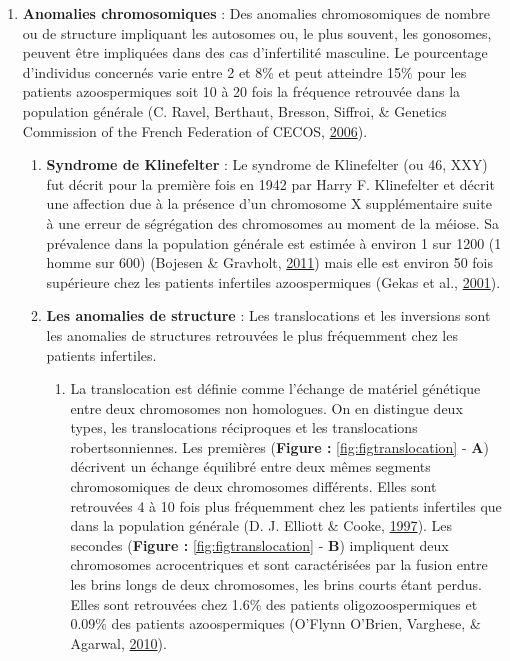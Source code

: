\documentclass[12pt,twoside]{reedthesis}
\providecommand{\tightlist}{%
  \setlength{\itemsep}{0pt}\setlength{\parskip}{0pt}}
\theoremstyle{definition}
\theoremstyle{definition}
\theoremstyle{remark}
\begin{document}
  \begin{enumerate}
  \def\labelenumi{\arabic{enumi}.}
  \setcounter{enumi}{1}
  \tightlist
  \item
    \textbf{Anomalies chromosomiques} : Des anomalies chromosomiques de
    nombre ou de structure impliquant les autosomes ou, le plus souvent,
    les gonosomes, peuvent être impliquées dans des cas d'infertilité
    masculine. Le pourcentage d'individus concernés varie entre 2 et 8\%
    et peut atteindre 15\% pour les patients azoospermiques soit 10 à 20
    fois la fréquence retrouvée dans la population générale (C. Ravel,
    Berthaut, Bresson, Siffroi, \& Genetics Commission of the French
    Federation of CECOS, \protect\hyperlink{ref-Ravel2006}{2006}).
  
    \begin{enumerate}
    \def\labelenumii{\alph{enumii}.}
    \item
      \textbf{Syndrome de Klinefelter} : Le syndrome de Klinefelter (ou
      46, XXY) fut décrit pour la première fois en 1942 par Harry F.
      Klinefelter et décrit une affection due à la présence d'un
      chromosome X supplémentaire suite à une erreur de ségrégation des
      chromosomes au moment de la méiose. Sa prévalence dans la population
      générale est estimée à environ 1 sur 1200 (1 homme sur 600) (Bojesen
      \& Gravholt, \protect\hyperlink{ref-Bojesen2011}{2011}) mais elle
      est environ 50 fois supérieure chez les patients infertiles
      azoospermiques (Gekas et al.,
      \protect\hyperlink{ref-Gekas2001}{2001}).
    \item
      \textbf{Les anomalies de structure} : Les translocations et les
      inversions sont les anomalies de structures retrouvées le plus
      fréquemment chez les patients infertiles.
  
      \begin{enumerate}
      \def\labelenumiii{\roman{enumiii}.}
      \tightlist
      \item
        La translocation est définie comme l'échange de matériel génétique
        entre deux chromosomes non homologues. On en distingue deux types,
        les translocations réciproques et les translocations
        robertsonniennes. Les premières (\textbf{Figure :}
        \ref{fig:figtranslocation} - \textbf{A}) décrivent un échange
        équilibré entre deux mêmes segments chromosomiques de deux
        chromosomes différents. Elles sont retrouvées 4 à 10 fois plus
        fréquemment chez les patients infertiles que dans la population
        générale (D. J. Elliott \& Cooke,
        \protect\hyperlink{ref-Elliott1997}{1997}). Les secondes
        (\textbf{Figure :} \ref{fig:figtranslocation} - \textbf{B})
        impliquent deux chromosomes acrocentriques et sont caractérisées
        par la fusion entre les brins longs de deux chromosomes, les brins
        courts étant perdus. Elles sont retrouvées chez 1.6\% des patients
        oligozoospermiques et 0.09\% des patients azoospermiques (O'Flynn
        O'Brien, Varghese, \& Agarwal,
        \protect\hyperlink{ref-OFlynnOBrien2010}{2010}).
      \end{enumerate}
    \end{enumerate}
  \end{enumerate}
  
\end{document}
